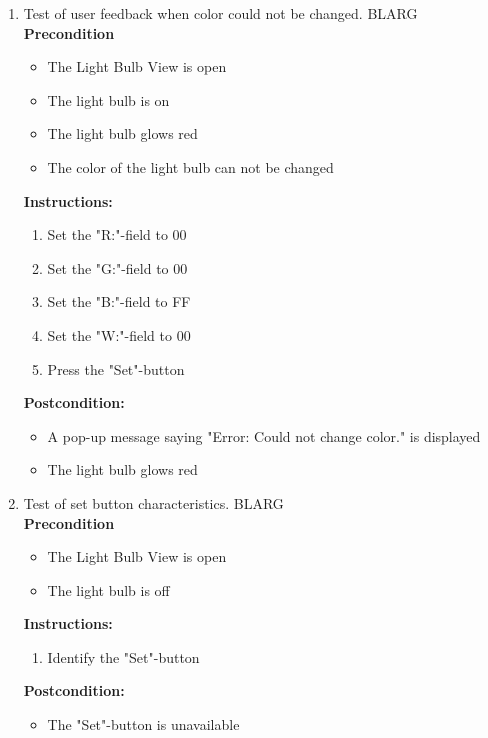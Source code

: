 \documentclass[a4paper]{article}
\newlength{\testlabellength}
\newenvironment{testlist}{\begin{enumerate}[label=\bfseries Instruction \thesubsection.\arabic* , labelindent=0pt, labelwidth=\testlabellength , leftmargin=2cm]}{\end{enumerate}}
\newenvironment{precondition}{
{\color{white}BLARG}\\ 
\textbf{Precondition}
\begin{itemize}[labelindent=0cm, labelwidth=2cm , leftmargin=1cm]
}
{\end{itemize}}
\newenvironment{instruction}{
\textbf{Instructions:}
\begin{enumerate}[label=\bfseries  \arabic*., labelindent=0cm, labelwidth=2cm , leftmargin=1cm]
}
{\end{enumerate}}
\newenvironment{postcondition}{
\textbf{Postcondition:}
\begin{itemize}[labelindent=0cm, labelwidth=2cm , leftmargin=1cm]
}
{\end{itemize}}
\begin{document}
\begin{appendices}
\begin{testlist}
	\item Test of user feedback when color could not be changed.
		\begin{precondition}
			\item The Light Bulb View is open
			\item The light bulb is on
			\item The light bulb glows red
			\item The color of the light bulb can not be changed
		\end{precondition}
		\begin{instruction}
			\item Set the "R:"-field to 00
			\item Set the "G:"-field to 00
			\item Set the "B:"-field to FF
			\item Set the "W:"-field to 00
			\item Press the "Set"-button
		\end{instruction}
		\begin{postcondition}
			\item A pop-up message saying "Error: Could not change color." is displayed
			\item The light bulb glows red
		\end{postcondition}
\newpage
	\item Test of set button characteristics.
		\begin{precondition}
			\item The Light Bulb View is open
			\item The light bulb is off
		\end{precondition}
		
		\begin{instruction}
			\item Identify the "Set"-button
		\end{instruction}

		\begin{postcondition}
			\item The "Set"-button is unavailable
		\end{postcondition}


\end{testlist}
\end{appendices}
\end{document}
